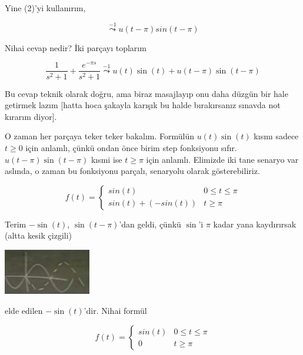 \documentclass[12pt,fleqn]{article}\usepackage{../../common}
\begin{document}
Yine (2)'yi kullanırım, 

$$\stackrel{-1}{\leadsto} u(t-\pi)sin(t-\pi) $$

Nihai cevap nedir? İki parçayı toplarım

$$ \frac{1}{s^2+1} + \frac{e^{-\pi s}}{s^2 + 1} \stackrel{-1}{\leadsto} 
u(t)\sin(t) + u(t-\pi)\sin(t-\pi) 
$$

Bu cevap teknik olarak doğru, ama biraz masajlayıp onu daha düzgün bir hale
getirmek lazım [hatta hoca şakayla karışık bu halde bırakırsanız sınavda
not kırarım diyor]. 

O zaman her parçaya teker teker bakalım. Formülün $u(t)\sin(t)$ kısmı
sadece $t \ge 0$ için anlamlı, çünkü ondan önce birim step fonksiyonu
sıfır. $u(t-\pi)\sin(t-\pi) $ kısmi ise $t \ge \pi$ için anlamlı. Elimizde
iki tane senaryo var aslında, o zaman bu fonksiyonu parçalı, senaryolu
olarak gösterebiliriz. 

$$ 
f(t) = 
\left\{ \begin{array}{ll}
sin(t) & 0 \le t \le \pi \\
sin(t) + (-sin(t)) & t \ge \pi
\end{array} \right.
 $$

Terim $-\sin(t)$, $\sin(t-\pi)$'dan geldi, çünkü $\sin$'i $\pi$ kadar yana
kaydırırsak (altta kesik çizgili) 

\includegraphics[height=2cm]{22_10.png}

elde edilen $-\sin(t)$'dir. Nihai formül

$$ 
f(t) = 
\left\{ \begin{array}{ll}
sin(t) & 0 \le t \le \pi \\
0 & t \ge \pi
\end{array} \right.
$$
\end{document}
